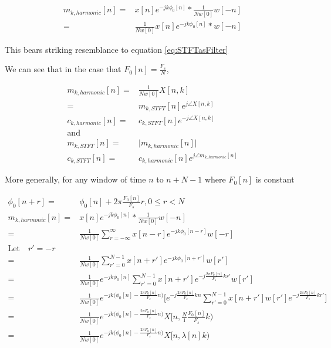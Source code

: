 \documentclass [11pt, proquest] {uwthesis}[2015/03/03]
\begin{document}
\begin{align}
m_{k,harmonic}[n] =& x[n] e^{-jk\phi_0 [n]} *  \frac{1}{Nw[0]} w[-n] \nonumber \\
=& \frac{1}{Nw[0]} x[n] e^{-jk\phi_0 [n]} *  w[-n]
\end{align}

This bears striking resemblance to equation \ref{eq:STFTasFilter}

We can see that in the case that $F_0[n] = \frac{F_s}{N}$,

\begin{align}
m_{k,harmonic}[n] =& \frac{1}{Nw[0]} X[n,k] \nonumber \\
=& m_{k,STFT}[n] e^{j \angle X[n,k]} \\
c_{k,harmonic}[n] =& c_{k,STFT}[n] e^{-j \angle X[n,k]} \\
\textrm{and} \nonumber \\
m_{k,STFT}[n] =& \vert m_{k,harmonic}[n] \vert \\
c_{k,STFT}[n] =& c_{k,harmonic}[n] e^{j \angle m_{k,harmonic}[n]}
\end{align}

More generally, for any window of time $n$ to $n + N - 1$ where $F_0[n]$ is constant

\begin{align}
\phi_0[n + r] =& \phi_0[n] + 2\pi \frac{F_0[n]}{F_s}r, 0 \leq r < N \\
m_{k,harmonic}[n] =& x[n] e^{-jk\phi_0 [n]} *  \frac{1}{Nw[0]} w[-n] \nonumber \\
=& \frac{1}{Nw[0]} \sum_{r = -\infty}^\infty x[n - r] e^{-jk\phi_0 [n-r]} w[-r] \nonumber \\
\textrm{Let} \quad r' = -r \nonumber \\
=& \frac{1}{Nw[0]} \sum_{r' = 0}^{N-1} x[n + r'] e^{-jk\phi_0 [n + r']} w[r'] \nonumber \\
=& \frac{1}{Nw[0]} e^{-jk \phi_0[n]} \sum_{r' = 0}^{N-1} x[n + r'] e^{-j \frac{2\pi F_0[n]}{F_s}kr'} w[r'] \nonumber \\
=& \frac{1}{Nw[0]} e^{-jk \Big(\phi_0[n] - \frac{2\pi F_0[n]}{F_s}n \Big)} \Bigg[ e^{-j \frac{2\pi F_0[n]}{F_s}kn} \sum_{r' = 0}^{N-1} x[n + r'] w[r'] e^{-j \frac{2\pi F_0[n]}{F_s}kr'} \Bigg] \nonumber \\
=& \frac{1}{Nw[0]} e^{-jk \Big(\phi_0[n] - \frac{2\pi F_0[n]}{F_s}n \Big)} X[n, \frac{N}{1} \frac{F_0[n]}{F_s} k) \nonumber \\
\label{eq:harmonic-to-stft}
=& \frac{1}{Nw[0]} e^{-jk \Big(\phi_0[n] - \frac{2\pi F_0[n]}{F_s}n \Big)} X[n, \lambda[n]k)
\end{align}
\end{document}

